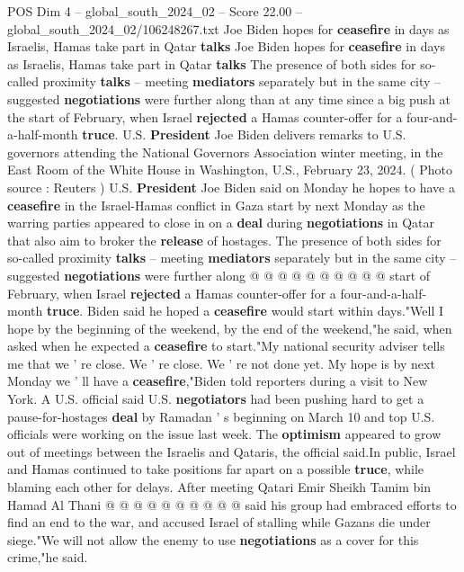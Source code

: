 \begin{textsample}{POS Dim 4 – global\_south\_2024\_02 – Score 22.00 – global\_south\_2024\_02/106248267.txt}  \label{ex:f4_pos_076}
Joe Biden hopes for \textbf{ceasefire} in days as Israelis, Hamas take part in Qatar \textbf{talks} Joe Biden hopes for \textbf{ceasefire} in days as Israelis, Hamas take part in Qatar \textbf{talks} The presence of both sides for so-called proximity \textbf{talks} -- meeting \textbf{mediators} separately but in the same city -- suggested \textbf{negotiations} were further along than at any time since a big push at the start of February, when Israel \textbf{rejected} a Hamas counter-offer for a four-and-a-half-month \textbf{truce}.
U.S. \textbf{President} Joe Biden delivers remarks to U.S. governors attending the National Governors Association winter meeting, in the East Room of the White House in Washington, U.S., February 23, 2024. ( Photo source : Reuters ) U.S. \textbf{President} Joe Biden said on Monday he hopes to have a \textbf{ceasefire} in the Israel-Hamas conflict in Gaza start by next Monday as the warring parties appeared to close in on a \textbf{deal} during \textbf{negotiations} in Qatar that also aim to broker the \textbf{release} of hostages.
The presence of both sides for so-called proximity \textbf{talks} -- meeting \textbf{mediators} separately but in the same city -- suggested \textbf{negotiations} were further along @ @ @ @ @ @ @ @ @ @ start of February, when Israel \textbf{rejected} a Hamas counter-offer for a four-and-a-half-month \textbf{truce}.
Biden said he hoped a \textbf{ceasefire} would start within days."Well I hope by the beginning of the weekend, by the end of the weekend,"he said, when asked when he expected a \textbf{ceasefire} to start."My national security adviser tells me that we ' re close.
We ' re close.
We ' re not done yet.
My hope is by next Monday we ' ll have a \textbf{ceasefire},"Biden told reporters during a visit to New York.
A U.S. official said U.S. \textbf{negotiators} had been pushing hard to get a pause-for-hostages \textbf{deal} by Ramadan ' s beginning on March 10 and top U.S. officials were working on the issue last week.
The \textbf{optimism} appeared to grow out of meetings between the Israelis and Qataris, the official said.In public, Israel and Hamas continued to take positions far apart on a possible \textbf{truce}, while blaming each other for delays.
After meeting Qatari Emir Sheikh Tamim bin Hamad Al Thani @ @ @ @ @ @ @ @ @ @ said his group had embraced efforts to find an end to the war, and accused Israel of stalling while Gazans die under siege."We will not allow the enemy to use \textbf{negotiations} as a cover for this crime,"he said.

\end{textsample}
